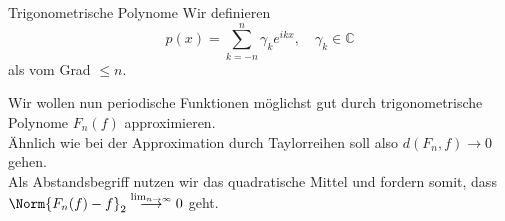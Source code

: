 \begin{Def}
{Trigonometrische Polynome}
Wir definieren
\begin{equation}
    p(x)=\sum_{k=-n}^n\gamma_ke^{ikx},\quad \gamma_k\in\mathbb{C}
\end{equation}
als  vom Grad $\leq n$.\\
\end{Def}
Wir wollen nun periodische Funktionen möglichst gut durch trigonometrische Polynome $F_n(f)$ approximieren.\\
Ähnlich wie bei der Approximation durch Taylorreihen soll also $d(F_n, f)\to 0$ gehen.\\
Als Abstandsbegriff nutzen wir das quadratische Mittel und fordern somit, dass\\ $\Norm{F_n(f)-f}_2\overset{\lim_{n\to\infty}}{\longrightarrow}0$ geht.
